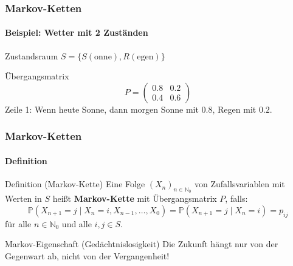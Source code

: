 \documentclass{beamer}
\newcommand{\N}{\mathbb{N}}
\newcommand{\PP}{\mathbb{P}}
\begin{document}

\begin{frame}
    \frametitle{Markov-Ketten}
\framesubtitle{Beispiel: Wetter mit 2 Zuständen}
    \begin{block}{Zustandsraum}
$S = \{S(\text{onne}), R(\text{egen})\}$
\end{block}

\begin{center}
\end{center}

\begin{block}{Übergangsmatrix}
\[
P = \begin{pmatrix} 0.8 & 0.2 \\ 0.4 & 0.6 \end{pmatrix}
\]
Zeile 1: Wenn heute Sonne, dann morgen Sonne mit $0.8$, Regen mit $0.2$.
\end{block}
 \end{frame}



\begin{frame}
    \frametitle{Markov-Ketten}
\framesubtitle{Definition}
    \begin{block}{Definition (Markov-Kette)}
Eine Folge $(X_n)_{n \in \N_0}$ von Zufallsvariablen mit Werten in $S$ heißt \textbf{Markov-Kette} mit Übergangsmatrix $P$, falls:
\[
\PP(X_{n+1} = j \mid X_n = i, X_{n-1}, \ldots, X_0) = \PP(X_{n+1} = j \mid X_n = i) = p_{ij}
\]
für alle $n \in \N_0$ und alle $i, j \in S$.
\end{block}
\begin{block}{Markov-Eigenschaft (Gedächtnislosigkeit)}
Die Zukunft hängt nur von der Gegenwart ab, nicht von der Vergangenheit!
\end{block}
 \end{frame}


\end{document}
